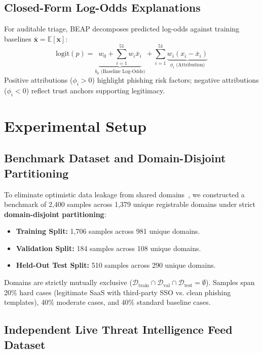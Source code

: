 \documentclass{llncs}
\begin{document}
\subsection{Closed-Form Log-Odds Explanations}

For auditable triage, BEAP decomposes predicted log-odds against training baselines $\bar{\mathbf{x}} = \mathbb{E}[\mathbf{x}]$:
\begin{equation}
\text{logit}(p) = \underbrace{w_0 + \sum_{i=1}^{51} w_i \bar{x}_i}_{b_0 \text{ (Baseline Log-Odds)}} + \sum_{i=1}^{51} \underbrace{w_i (x_i - \bar{x}_i)}_{\phi_i \text{ (Attribution)}}
\end{equation}
Positive attributions ($\phi_i > 0$) highlight phishing risk factors; negative attributions ($\phi_i < 0$) reflect trust anchors supporting legitimacy.

\section{Experimental Setup}

\subsection{Benchmark Dataset and Domain-Disjoint Partitioning}

To eliminate optimistic data leakage from shared domains~\cite{sanchez2022}, we constructed a benchmark of 2,400 samples across 1,379 unique registrable domains under strict \textbf{domain-disjoint partitioning}:
\begin{itemize}[leftmargin=1.5em]
    \item \textbf{Training Split:} 1,706 samples across 981 unique domains.
    \item \textbf{Validation Split:} 184 samples across 108 unique domains.
    \item \textbf{Held-Out Test Split:} 510 samples across 290 unique domains.
\end{itemize}
Domains are strictly mutually exclusive ($\mathcal{D}_{\text{train}} \cap \mathcal{D}_{\text{val}} \cap \mathcal{D}_{\text{test}} = \emptyset$). Samples span 20\% hard cases (legitimate SaaS with third-party SSO vs. clean phishing templates), 40\% moderate cases, and 40\% standard baseline cases.

\subsection{Independent Live Threat Intelligence Feed Dataset}
\end{document}
